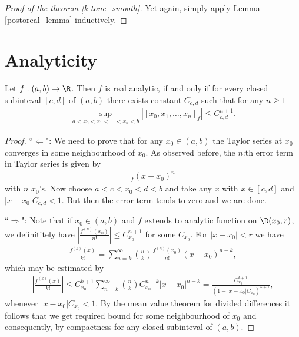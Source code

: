 \begin{proof}[Proof of the theorem \ref{k-tone_smooth}]
	Yet again, simply apply Lemma \ref{postoreal_lemma} inductively.
\end{proof}

\section{Analyticity}

\begin{lause}\label{div_anal}
	Let $f : (a, b) \to \R$. Then $f$ is real analytic, if and only if for every closed subinteval $[c, d]$ of $(a, b)$ there exists constant $C_{c, d}$ such that for any $n \geq 1$
	\begin{align*}
		\sup_{a < x_{0} < x_{1} < \ldots < x_{n}< b} |[x_{0}, x_{1}, \ldots, x_{n}]_{f}| \leq C_{c, d}^{n + 1}.
	\end{align*}
\end{lause}
\begin{proof}
	``$\Leftarrow$": We need to prove that for any $x_{0} \in (a, b)$ the Taylor series at $x_{0}$ converges in some neighbourhood of $x_{0}$. As observed before, the $n$:th error term in Taylor series is given by
	\begin{align*}
		[x, x_{0}, x_{0}, \ldots, x_{0}]_{f} (x - x_{0})^{n}
	\end{align*}
	with $n$ $x_{0}$'s. Now choose $a < c < x_{0} < d < b$ and take any $x$ with $x \in [c, d]$ and $|x - x_{0}| C_{c, d} < 1$. But then the error term tends to zero and we are done.

	``$\Rightarrow$": Note that if $x_{0} \in (a, b)$ and $f$ extends to analytic function on $\D(x_{0}, r)$, we definititely have $\left|\frac{f^{(n)}(x_{0})}{n!}\right| \leq C_{x_{0}}^{n + 1}$ for some $C_{x_{0}}$. For $|x - x_{0}| < r$ we have
	\begin{align*}
		\frac{f^{(k)}(x)}{k!} = \sum_{n = k}^{\infty} \binom{n}{k} \frac{f^{(n)}(x_{0})}{n!} (x - x_{0})^{n - k},
	\end{align*}
	which may be estimated by
	\begin{align*}
	 \left|\frac{f^{(k)}(x)}{k!}\right| \leq C_{x_{0}}^{k + 1}\sum_{n = k}^{\infty} \binom{n}{k} C_{x_{0}}^{n - k} |x - x_{0}|^{n - k} = \frac{C_{x_{0}}^{k + 1} }{(1 - |x - x_{0}| C_{x_{0}})^{k + 1}},
	\end{align*}
	whenever $|x - x_{0}| C_{x_{0}} < 1$. By the mean value theorem for divided differences it follows that we get required bound for some neighbourhood of $x_{0}$ and consequently, by compactness for any closed subinteval of $(a, b)$.
\end{proof}

